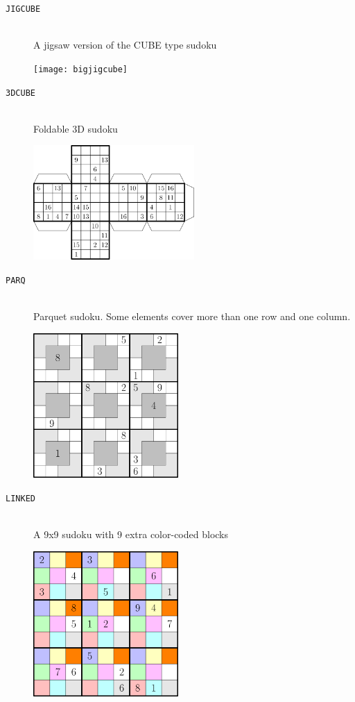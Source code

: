 \documentclass[12pt]{article}
\begin{document}
\begin{description}
\begin{center}
\end{center}
\item [\texttt{JIGCUBE}] \hfill \\ A jigsaw version of the CUBE type sudoku	
\begin{center}
	\texttt{[image: bigjigcube]}	
\end{center}
\item [\texttt{3DCUBE}] \hfill \\ Foldable 3D sudoku
\begin{center}
	\includegraphics[width=0.5\textwidth]{3dcube}	
\end{center}
\item [\texttt{PARQ}]  \hfill \\ Parquet sudoku. Some elements cover more than one row and one column.	
\begin{center}
	\includegraphics[width=0.45\textwidth]{parquet}	
\end{center}
\item [\texttt{LINKED}]  \hfill \\ A 9x9 sudoku with 9 extra color-coded blocks 	
\begin{center}
	\includegraphics[width=0.45\textwidth]{linked}	
\end{center}
\end{description}
\end{document}

